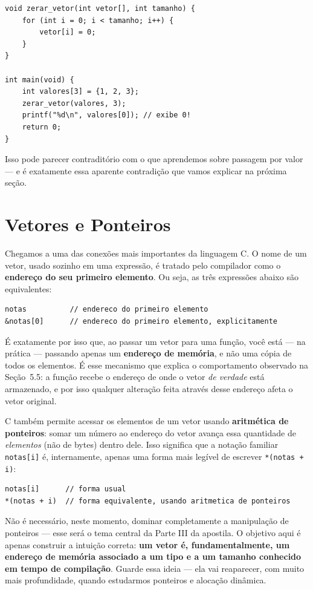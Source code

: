 \documentclass[12pt,a4paper,oneside]{extreport}
\begin{document}
\begin{lstlisting}
void zerar_vetor(int vetor[], int tamanho) {
    for (int i = 0; i < tamanho; i++) {
        vetor[i] = 0;
    }
}

int main(void) {
    int valores[3] = {1, 2, 3};
    zerar_vetor(valores, 3);
    printf("%d\n", valores[0]); // exibe 0!
    return 0;
}
\end{lstlisting}

Isso pode parecer contraditório com o que aprendemos sobre passagem por valor — e é exatamente essa aparente contradição que vamos explicar na próxima seção.

\section{Vetores e Ponteiros}
\label{sec:vetores-ponteiros}

Chegamos a uma das conexões mais importantes da linguagem C. O nome de um vetor, usado sozinho em uma expressão, é tratado pelo compilador como o \textbf{endereço do seu primeiro elemento}. Ou seja, as três expressões abaixo são equivalentes:

\begin{lstlisting}
notas          // endereco do primeiro elemento
&notas[0]      // endereco do primeiro elemento, explicitamente
\end{lstlisting}

É exatamente por isso que, ao passar um vetor para uma função, você está — na prática — passando apenas um \textbf{endereço de memória}, e não uma cópia de todos os elementos. É esse mecanismo que explica o comportamento observado na Seção~5.5: a função recebe o endereço de onde o vetor \textit{de verdade} está armazenado, e por isso qualquer alteração feita através desse endereço afeta o vetor original.

C também permite acessar os elementos de um vetor usando \textbf{aritmética de ponteiros}: somar um número ao endereço do vetor avança essa quantidade de \textit{elementos} (não de bytes) dentro dele. Isso significa que a notação familiar \texttt{notas[i]} é, internamente, apenas uma forma mais legível de escrever \texttt{*(notas + i)}:

\begin{lstlisting}
notas[i]      // forma usual
*(notas + i)  // forma equivalente, usando aritmetica de ponteiros
\end{lstlisting}

Não é necessário, neste momento, dominar completamente a manipulação de ponteiros — esse será o tema central da Parte III da apostila. O objetivo aqui é apenas construir a intuição correta: \textbf{um vetor é, fundamentalmente, um endereço de memória associado a um tipo e a um tamanho conhecido em tempo de compilação}. Guarde essa ideia — ela vai reaparecer, com muito mais profundidade, quando estudarmos ponteiros e alocação dinâmica.
\end{document}
